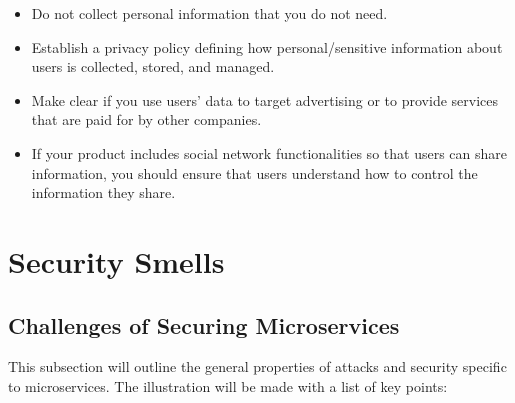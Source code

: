 \begin{itemize}
	\item Do not collect personal information that you do not need.
    \item Establish a privacy policy defining how personal/sensitive information about users is collected, stored, and managed.
	\item Make clear if you use users’ data to target advertising or to provide services that are paid for by other companies.
	\item If your product includes social network functionalities so that users can share information, you should ensure that users understand how to control the information they share.
\end{itemize}

\section{Security Smells}

\subsection{Challenges of Securing Microservices}

This subsection will outline the general properties of attacks and security specific to microservices. The illustration will be made with a list of key points:

